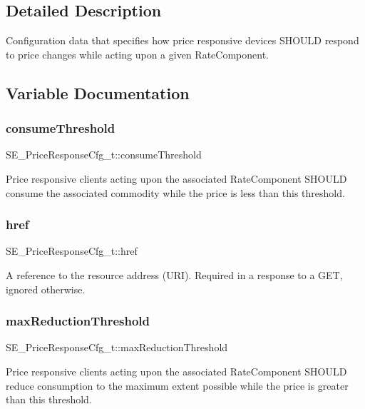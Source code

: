 \subsection{Detailed Description}
Configuration data that specifies how price responsive devices S\+H\+O\+U\+LD respond to price changes while acting upon a given Rate\+Component. 

\subsection{Variable Documentation}
\mbox{\label{group__PriceResponseCfg_gac5930323b3f189fe2f37e2b3fa3ce664}} 
\subsubsection{\texorpdfstring{consume\+Threshold}{consumeThreshold}}
{\footnotesize\ttfamily S\+E\+\_\+\+Price\+Response\+Cfg\+\_\+t\+::consume\+Threshold}

Price responsive clients acting upon the associated Rate\+Component S\+H\+O\+U\+LD consume the associated commodity while the price is less than this threshold. \mbox{\label{group__PriceResponseCfg_ga69527458c9f8ce19064de8c147233538}} 
\subsubsection{\texorpdfstring{href}{href}}
{\footnotesize\ttfamily S\+E\+\_\+\+Price\+Response\+Cfg\+\_\+t\+::href}

A reference to the resource address (U\+RI). Required in a response to a G\+ET, ignored otherwise. \mbox{\label{group__PriceResponseCfg_gac8c8682a843512f53f0a853a36604a5b}} 
\subsubsection{\texorpdfstring{max\+Reduction\+Threshold}{maxReductionThreshold}}
{\footnotesize\ttfamily S\+E\+\_\+\+Price\+Response\+Cfg\+\_\+t\+::max\+Reduction\+Threshold}

Price responsive clients acting upon the associated Rate\+Component S\+H\+O\+U\+LD reduce consumption to the maximum extent possible while the price is greater than this threshold. 